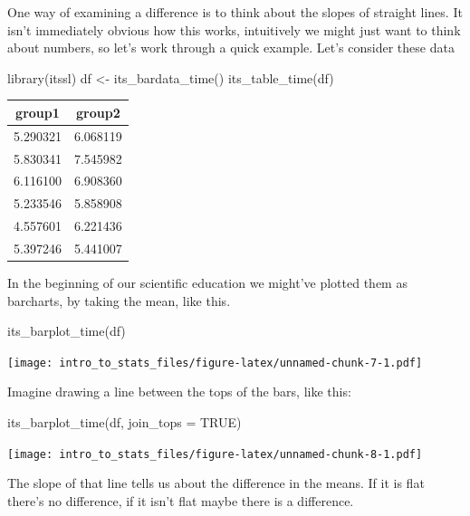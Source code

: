 \documentclass[
]{book}
\newenvironment{Shaded}{\begin{snugshade}}{\end{snugshade}}
\newcommand{\AttributeTok}[1]{\textcolor[rgb]{0.77,0.63,0.00}{#1}}
\newcommand{\ConstantTok}[1]{\textcolor[rgb]{0.00,0.00,0.00}{#1}}
\newcommand{\FunctionTok}[1]{\textcolor[rgb]{0.00,0.00,0.00}{#1}}
\newcommand{\NormalTok}[1]{#1}
\newcommand{\OtherTok}[1]{\textcolor[rgb]{0.56,0.35,0.01}{#1}}
\begin{document}
One way of examining a difference is to think about the slopes of straight lines. It isn't immediately obvious how this works, intuitively we might just want to think about numbers, so let's work through a quick example. Let's consider these data

\begin{Shaded}
\begin{Highlighting}[]
\FunctionTok{library}\NormalTok{(itssl)}
\NormalTok{df }\OtherTok{\textless{}{-}} \FunctionTok{its\_bardata\_time}\NormalTok{()}
\FunctionTok{its\_table\_time}\NormalTok{(df)}
\end{Highlighting}
\end{Shaded}

\begin{tabular}{c|c}
\hline
group1 & group2\\
\hline
5.290321 & 6.068119\\
\hline
5.830341 & 7.545982\\
\hline
6.116100 & 6.908360\\
\hline
5.233546 & 5.858908\\
\hline
4.557601 & 6.221436\\
\hline
5.397246 & 5.441007\\
\hline
\end{tabular}

In the beginning of our scientific education we might've plotted them as barcharts, by taking the mean, like this.

\begin{Shaded}
\begin{Highlighting}[]
\FunctionTok{its\_barplot\_time}\NormalTok{(df)}
\end{Highlighting}
\end{Shaded}

\texttt{[image: intro\_to\_stats\_files/figure-latex/unnamed-chunk-7-1.pdf]}

Imagine drawing a line between the tops of the bars, like this:

\begin{Shaded}
\begin{Highlighting}[]
\FunctionTok{its\_barplot\_time}\NormalTok{(df, }\AttributeTok{join\_tops =} \ConstantTok{TRUE}\NormalTok{)}
\end{Highlighting}
\end{Shaded}

\texttt{[image: intro\_to\_stats\_files/figure-latex/unnamed-chunk-8-1.pdf]}

The slope of that line tells us about the difference in the means. If it is flat there's no difference, if it isn't flat maybe there is a difference.
\end{document}
